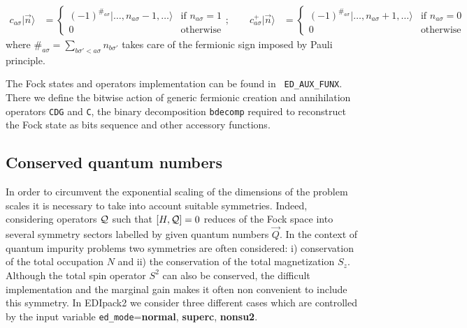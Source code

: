 \documentclass[preprint,3p,10pt]{elsarticle}
\newcommand{\ket}[1]
{|#1\rangle}
\def\NAME{{\rm EDIpack2 }}
\begin{document}
\begin{align*}
  c_{a\sigma}\ket{\vec{n}} &=
    \begin{cases}
      (-1)^{\#_{a\sigma}}\ket{\dots,n_{a\sigma}\!-\!1,\dots}
      &\text{if $n_{a\sigma}\!=\! 1$}\\
      0 &\text{otherwise}
    \end{cases};\qquad
    c^{+}_{a\sigma}\ket{\vec{n}} &=
     \begin{cases}
      (-1)^{\#_{a\sigma}}\ket{\dots,n_{a\sigma}\!+\!1,\dots}
      & \text{if $n_{a\sigma}\!=\! 0$}\\
      0 & \text{otherwise}
    \end{cases}    
\end{align*}
where $\#_{a\sigma}=\sum_{b\sigma'<a\sigma} n_{b\sigma'}$ takes care
of the fermionic sign imposed by Pauli principle. 

The Fock states and operators implementation can be found in {\tt
  ED\_AUX\_FUNX}. There we define the bitwise action of generic fermionic creation
and annihilation operators {\tt CDG} and {\tt C}, the binary
decomposition {\tt bdecomp} required to reconstruct the Fock state as
bits sequence and other accessory functions. 

\subsection{Conserved quantum numbers}\label{sSecQNs}
In order to circumvent the exponential scaling of the dimensions of
the problem scales it is necessary to take into account suitable symmetries.
Indeed, considering operators ${\cal Q}$ such that $[H, {\cal Q}]=0$
reduces of the Fock space into several symmetry sectors
labelled by given quantum numbers $\vec{Q}$. 
In the context of quantum impurity problems two symmetries are often considered: i)
conservation of the total occupation $N$ and ii) the
conservation of the total magnetization $S_z$. Although the total spin
operator $S^2$ can also be conserved, the difficult  implementation
and the marginal gain makes it often non convenient to include this symmetry.
In \NAME we consider three different cases which are controlled by the
input variable {\tt ed\_mode}={\bf normal}, {\bf superc}, {\bf
  nonsu2}. 
\end{document}
